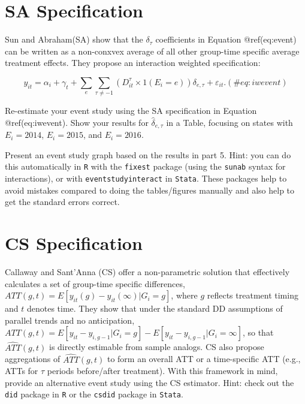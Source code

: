 \documentclass[
  12pt,
]{article}
\begin{document}
\hypertarget{sa-specification}{%
\section{SA Specification}\label{sa-specification}}

Sun and Abraham(SA) show that the \(\delta_{\tau}\) coefficients in
Equation @ref(eq:event) can be written as a non-conxvex average of all
other group-time specific average treatment effects. They propose an
interaction weighted specification:

\begin{equation}
y_{it} = \alpha_{i} + \gamma_{t} +\sum_{e} \sum_{\tau \neq -1} \left(D_{it}^{\tau} \times 1(E_{i}=e)\right) \delta_{e, \tau} + \varepsilon_{it}.
(\#eq:iwevent)
\end{equation}

Re-estimate your event study using the SA specification in Equation
@ref(eq:iwevent). Show your results for \(\hat{\delta}_{e, \tau}\) in a
Table, focusing on states with \(E_{i}=2014\), \(E_{i}=2015\), and
\(E_{i}=2016\).

Present an event study graph based on the results in part 5. Hint: you
can do this automatically in \texttt{R} with the \texttt{fixest} package
(using the \texttt{sunab} syntax for interactions), or with
\texttt{eventstudyinteract} in \texttt{Stata}. These packages help to
avoid mistakes compared to doing the tables/figures manually and also
help to get the standard errors correct.

\hypertarget{cs-specification}{%
\section{CS Specification}\label{cs-specification}}

Callaway and Sant'Anna (CS) offer a non-parametric solution that
effectively calculates a set of group-time specific differences,
\(ATT(g,t)= E[y_{it}(g) - y_{it}(\infty) | G_{i}=g]\), where \(g\)
reflects treatment timing and \(t\) denotes time. They show that under
the standard DD assumptions of parallel trends and no anticipation,
\(ATT(g,t) = E[y_{it} - y_{i, g-1} | G_{i}=g] - E[y_{it} - y_{i,g-1} | G_{i} = \infty]\),
so that \(\hat{ATT}(g,t)\) is directly estimable from sample analogs. CS
also propose aggregations of \(\hat{ATT}(g,t)\) to form an overall ATT
or a time-specific ATT (e.g., ATTs for \(\tau\) periods before/after
treatment). With this framework in mind, provide an alternative event
study using the CS estimator. Hint: check out the \texttt{did} package
in \texttt{R} or the \texttt{csdid} package in \texttt{Stata}.
\end{document}
